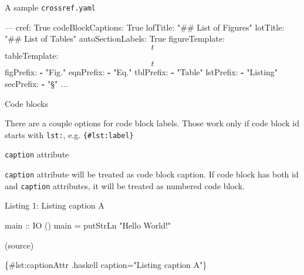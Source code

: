 \documentclass[10pt,ignorenonframetext,serif,onlymath]{beamer}
\newenvironment{Shaded}{}{}
\newcommand{\AttributeTok}[1]{\textcolor[rgb]{0.49,0.56,0.16}{#1}}
\newcommand{\CommentTok}[1]{\textcolor[rgb]{0.38,0.63,0.69}{\textit{#1}}}
\newcommand{\DataTypeTok}[1]{\textcolor[rgb]{0.56,0.13,0.00}{#1}}
\newcommand{\FunctionTok}[1]{\textcolor[rgb]{0.02,0.16,0.49}{#1}}
\newcommand{\KeywordTok}[1]{\textcolor[rgb]{0.00,0.44,0.13}{\textbf{#1}}}
\newcommand{\NormalTok}[1]{#1}
\newcommand{\OtherTok}[1]{\textcolor[rgb]{0.00,0.44,0.13}{#1}}
\newcommand{\StringTok}[1]{\textcolor[rgb]{0.25,0.44,0.63}{#1}}
\begin{document}
\begin{frame}[fragile]{A sample \texttt{crossref.yaml}}
\protect\hypertarget{sec:a-sample-crossref.yaml}{}

\scriptsize

\begin{Shaded}
\begin{Highlighting}[]
\OtherTok{---}
\FunctionTok{cref:}\AttributeTok{ True}
\FunctionTok{codeBlockCaptions:}\AttributeTok{ True}
\FunctionTok{lofTitle:}\AttributeTok{ }\StringTok{"## List of Figures"}
\FunctionTok{lotTitle:}\AttributeTok{ }\StringTok{"## List of Tables"}
\FunctionTok{autoSectionLabels:}\AttributeTok{ True}
\FunctionTok{figureTemplate:}\AttributeTok{ $$t$$}
\FunctionTok{tableTemplate:}\AttributeTok{ $$t$$}
\FunctionTok{figPrefix:}
  \KeywordTok{-} \StringTok{"Fig."}
\FunctionTok{eqnPrefix:}
  \KeywordTok{-} \StringTok{"Eq."}
\FunctionTok{tblPrefix:}
  \KeywordTok{-} \StringTok{"Table"}
\FunctionTok{lstPrefix:}
  \KeywordTok{-} \StringTok{"Listing"}
\FunctionTok{secPrefix:}
  \KeywordTok{-} \StringTok{"§"}
\CommentTok{...}
\end{Highlighting}
\end{Shaded}

\end{frame}

\begin{frame}[fragile]{Code blocks}
\protect\hypertarget{sec:code-blocks}{}

There are a couple options for code block labels. Those work only if
code block id starts with \texttt{lst:}, e.g. \texttt{\{\#lst:label\}}

\end{frame}

\begin{frame}[fragile]{\texttt{caption} attribute}
\protect\hypertarget{sec:caption-attr}{}

\texttt{caption} attribute will be treated as code block caption. If
code block has both id and \texttt{caption} attributes, it will be
treated as numbered code block.

\leavevmode\hypertarget{lst:captionAttr}{}%
Listing 1: Listing caption A

\begin{Shaded}
\begin{Highlighting}[]
\OtherTok{main ::} \DataTypeTok{IO}\NormalTok{ ()}
\NormalTok{main }\FunctionTok{=}\NormalTok{ putStrLn }\StringTok{"Hello World!"}
\end{Highlighting}
\end{Shaded}

(source)

\begin{Shaded}
\begin{Highlighting}[]
\NormalTok{\{#lst:captionAttr .haskell caption="Listing caption A"\}}
\end{Highlighting}
\end{Shaded}

\end{frame}
\end{document}
